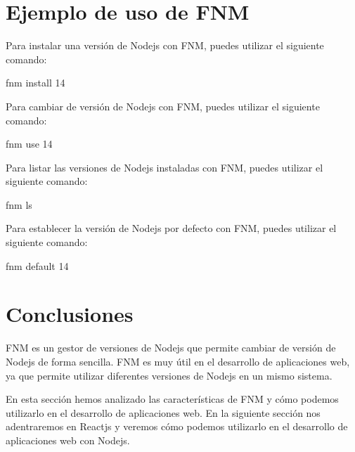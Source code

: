 \documentclass[
  a4paper,
  DIV=11,
  numbers=noendperiod,
  onepage,
  openany]{scrreprt}
\newenvironment{Shaded}{\begin{snugshade}}{\end{snugshade}}
\newcommand{\ExtensionTok}[1]{\textcolor[rgb]{0.00,0.23,0.31}{#1}}
\newcommand{\NormalTok}[1]{\textcolor[rgb]{0.00,0.23,0.31}{#1}}
\begin{document}
\section{Ejemplo de uso de FNM}\label{ejemplo-de-uso-de-fnm}

Para instalar una versión de Nodejs con FNM, puedes utilizar el
siguiente comando:

\begin{Shaded}
\begin{Highlighting}[]
\ExtensionTok{fnm}\NormalTok{ install 14}
\end{Highlighting}
\end{Shaded}

Para cambiar de versión de Nodejs con FNM, puedes utilizar el siguiente
comando:

\begin{Shaded}
\begin{Highlighting}[]
\ExtensionTok{fnm}\NormalTok{ use 14}
\end{Highlighting}
\end{Shaded}

Para listar las versiones de Nodejs instaladas con FNM, puedes utilizar
el siguiente comando:

\begin{Shaded}
\begin{Highlighting}[]
\ExtensionTok{fnm}\NormalTok{ ls}
\end{Highlighting}
\end{Shaded}

Para establecer la versión de Nodejs por defecto con FNM, puedes
utilizar el siguiente comando:

\begin{Shaded}
\begin{Highlighting}[]
\ExtensionTok{fnm}\NormalTok{ default 14}
\end{Highlighting}
\end{Shaded}

\section{Conclusiones}\label{conclusiones-5}

FNM es un gestor de versiones de Nodejs que permite cambiar de versión
de Nodejs de forma sencilla. FNM es muy útil en el desarrollo de
aplicaciones web, ya que permite utilizar diferentes versiones de Nodejs
en un mismo sistema.

En esta sección hemos analizado las características de FNM y cómo
podemos utilizarlo en el desarrollo de aplicaciones web. En la siguiente
sección nos adentraremos en Reactjs y veremos cómo podemos utilizarlo en
el desarrollo de aplicaciones web con Nodejs.
\end{document}
